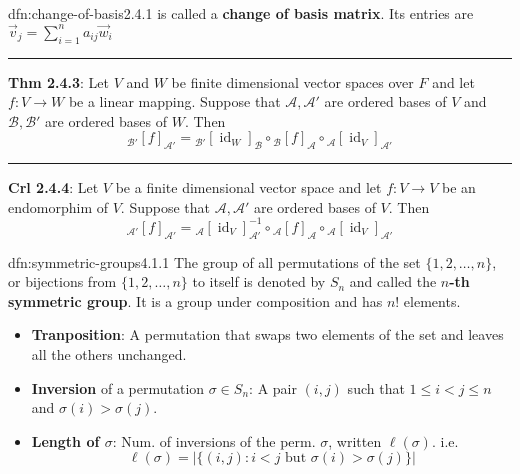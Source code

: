\documentclass[landscape, 8pt]{extarticle}
\DeclareMathOperator{\id}{id}
\begin{document}
\begin{multicols}{3}
\begin{dfn}{dfn:change-of-basis}{2.4.1}
    \vspace{-2pt}
    is called a \textbf{change of basis matrix}. Its entries are $\vec{v}_{j} = \sum_{i = 1}^{n} a_{ij}\vec{w}_{i}$

    \vspace{-3pt}
    \noindent\rule{\textwidth}{0.2pt}
    \textbf{Thm 2.4.3}: Let $V$ and $W$ be finite dimensional vector spaces over $F$ and let $f : V \to W$ be a linear mapping. Suppose that $\mathcal{A}, \mathcal{A}'$ are ordered bases of $V$ and $\mathcal{B}, \mathcal{B}'$ are ordered bases of $W$. Then
    \[{}_{\mathcal{B}'}[f]_{\mathcal{A}'} = {}_{\mathcal{B}'}[\id_{W}]_{\mathcal{B}} \circ {}_{\mathcal{B}}[f]_{\mathcal{A}} \circ {}_{\mathcal{A}}[\id_{V}]_{\mathcal{A}'}\]

    \vspace{-5pt}
    \noindent\rule{\textwidth}{0.2pt}
    \textbf{Crl 2.4.4}: Let $V$ be a finite dimensional vector space and let $f : V \to V$ be an endomorphim of $V$. Suppose that $\mathcal{A}, \mathcal{A}'$ are ordered bases of $V$. Then
    \[{}_{\mathcal{A}'}[f]_{\mathcal{A}'} = {}_{\mathcal{A}}[\id_{V}]_{\mathcal{A}'}^{-1} \circ {}_{\mathcal{A}}[f]_{\mathcal{A}} \circ {}_{\mathcal{A}}[\id_{V}]_{\mathcal{A}'}\]
\end{dfn}

\vspace{-5pt}
\begin{dfn}{dfn:symmetric-groups}{4.1.1}
    \vspace{-5pt}
    The group of all permutations of the set $\{1,2,\dots,n\}$, or bijections from $\{1,2,\dots,n\}$ to itself is denoted by $S_{n}$ and called the \textbf{$n$-th symmetric group}. It is a group under composition and has $n!$ elements.

    \vspace{-5pt}
    \begin{itemize}[leftmargin=*]
        \setlength\itemsep{0em}
        \item \textbf{Tranposition}: A permutation that swaps two elements of the set and leaves all the others unchanged.
        \item \textbf{Inversion} of a permutation $\sigma\in S_{n}$: A pair $(i, j)$ such that $1 \le i < j \le n$ and $\sigma(i) > \sigma(j)$.         \item \textbf{Length of $\sigma$}: Num. of inversions of the perm. $\sigma$, written $\ell(\sigma)$. i.e.
        \[\ell(\sigma) = \lvert \{(i,j) : i < j \text{ but } \sigma(i) > \sigma(j)\} \rvert\]


\end{itemize}
\end{dfn}
\end{multicols}
\end{document}

